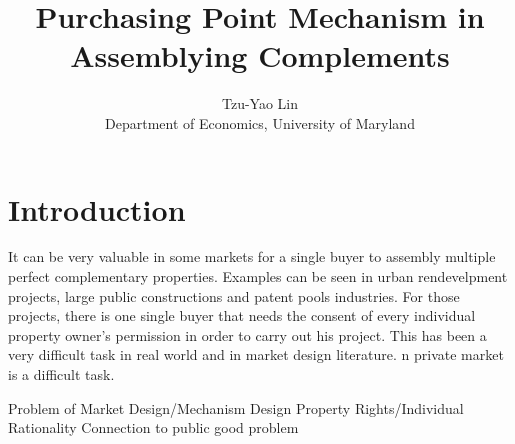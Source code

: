 \documentclass[11pt]{article}
\begin{document}
\title{Purchasing Point Mechanism in Assemblying Complements}

\author{Tzu-Yao Lin
\medskip\\{\normalsize Department of Economics, University of Maryland}}
\maketitle

\sloppy%




\strut




\doublespacing %


\section{Introduction}
 It can be very valuable in some markets for a single buyer to assembly multiple perfect complementary properties. Examples can be seen in urban rendevelpment projects, large public constructions and patent pools industries. For those projects, there is one single buyer that needs the consent of every individual property owner's permission in order to carry out his project. This has been a very difficult task in real world and in market design literature. n private market is a difficult task. 

Problem of Market Design/Mechanism Design
Property Rights/Individual Rationality
Connection to public good problem




   
    
    
\end{document}
